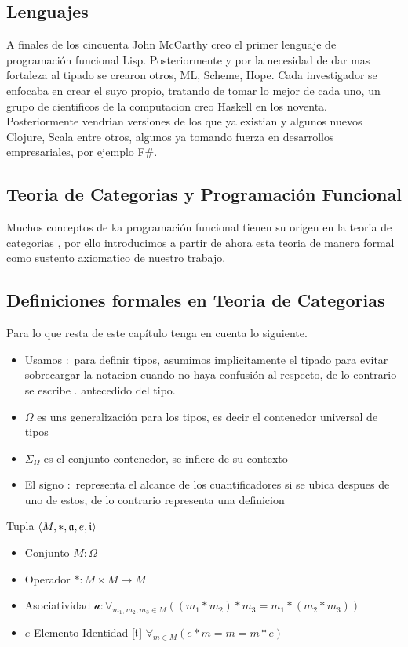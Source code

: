 \subsection{Lenguajes}

A finales de los cincuenta John McCarthy creo el primer lenguaje de programación funcional Lisp. Posteriormente y por la necesidad de dar mas fortaleza al tipado se crearon otros, ML, Scheme, Hope. Cada investigador se enfocaba en crear el suyo propio, tratando de tomar lo mejor de cada uno, un grupo de cientificos de la computacion creo Haskell en los noventa. Posteriormente vendrian versiones de los que ya existian y algunos nuevos Clojure, Scala entre otros, algunos ya tomando fuerza en desarrollos empresariales, por ejemplo F\#.

\subsection{Teoria de Categorias y Programación Funcional}

Muchos conceptos de ka programación funcional tienen su origen en la teoria de categorias 
\cite{MacLane1978}, por ello introducimos a partir de ahora esta teoria de manera formal
\cite{Cornell} como sustento axiomatico de nuestro trabajo.

\subsection{Definiciones formales en Teoria de Categorias}

Para lo que resta de este capítulo tenga en cuenta lo siguiente.
\begin{itemize}
\item Usamos $:$ para definir tipos, asumimos implicitamente el tipado para evitar sobrecargar la notacion cuando no haya confusión al respecto, de lo contrario se escribe $.$ antecedido del tipo.
\item $\Omega$ es uns generalización para los tipos, es decir el contenedor universal de tipos
\item $\Sigma_{\Omega}$ es el conjunto contenedor, se infiere de su contexto
\item El signo $:$ representa el alcance de los cuantificadores si se ubica despues de uno de estos, de lo contrario representa una definicion
\end{itemize}

\begin{defn}[Monoide]
\end{defn}
Tupla $\langle M, *, \mathfrak{a}, e, \mathfrak{i} \rangle$ 
\begin{itemize}
\item Conjunto $M: \Omega$
\item Operador $* : M \times M \to M$
\item Asociatividad $\mathcal{a} : \forall_{m_1, m_2, m_3 \in M} ((m_1 * m_2) * m_3 = m_1 * (m_2 * m_3))$
\item $e$ Elemento Identidad [$\mathfrak{i}$] $\forall_{m \in M} ( e * m = m = m * e)$
\end{itemize}

